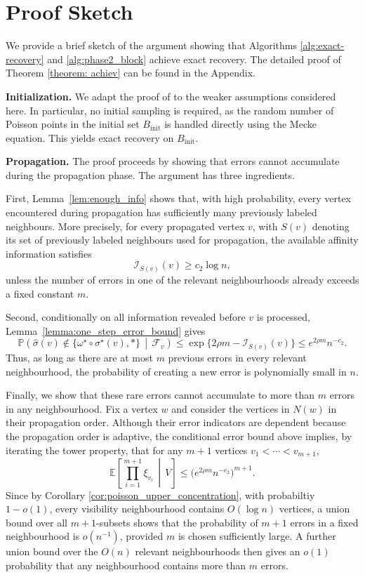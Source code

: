 \documentclass[11pt, a4paper]{amsart}
\newcommand{\1}{\mathbf{1}}
\theoremstyle{definition}
\theoremstyle{remark}
\theoremstyle{definition}
\begin{document}
\section{Proof Sketch}
We provide a brief sketch of the argument showing that Algorithms \ref{alg:exact-recovery} and \ref{alg:phase2_block} achieve exact recovery. The detailed proof of Theorem \ref{theorem: achiev} can be found in the Appendix. 

\textbf{Initialization.} We adapt the proof of \cite{gaudio2026jan} to the weaker assumptions considered here. In particular, no initial sampling is required, as the random number of Poisson points in the initial set $B_{\mathrm{init}}$ is handled directly using the Mecke equation. This yields exact recovery on $B_{\mathrm{init}}$.

\textbf{Propagation.}
The proof proceeds by showing that errors cannot accumulate during the
propagation phase. The argument has three ingredients.

First, Lemma~\ref{lem:enough_info} shows that, with high probability,
every vertex encountered during propagation has sufficiently many
previously labeled neighbours. More precisely, for every propagated vertex $v$, with $S(v)$ denoting its set of previously labeled neighbours used for propagation, the available affinity information satisfies
\[
\mathcal I_{S(v)}(v)\ge c_2\log n,
\]
unless the number of errors in one of the relevant neighbourhoods already
exceeds a fixed constant \(m\).

Second, conditionally on all information revealed before \(v\) is
processed, Lemma~\ref{lemma:one_step_error_bound} gives
\[
\mathbb P\left(
\widehat\sigma(v)\notin
\{\omega^\star\circ\sigma^\star(v),*\}
\,\middle|\,\mathcal F_v
\right)
\le
\exp\{2\rho m-\mathcal I_{S(v)}(v)\}
\le e^{2\rho m}n^{-c_2}.
\]
Thus, as long as there are at most \(m\) previous errors in every relevant
neighbourhood, the probability of creating a new error is polynomially
small in \(n\).

Finally, we show that these rare errors cannot accumulate to more than
\(m\) errors in any neighbourhood. Fix a vertex \(w\) and consider the
vertices in \(N(w)\) in their propagation order. Although their error
indicators are dependent because the propagation order is adaptive, the
conditional error bound above implies, by iterating the tower property,
that for any \(m+1\) vertices \(v_1<\cdots<v_{m+1}\),
\[
\mathbb E\left[
\prod_{i=1}^{m+1}\xi_{v_i}\,\middle|\,V
\right]
\le
\bigl(e^{2\rho m}n^{-c_2}\bigr)^{m+1}.
\]
Since by Corollary \ref{cor:poisson_upper_concentration}, with probabiltiy $1-o(1)$, every visibility neighbourhood contains  \(O(\log n)\) vertices, a union bound over all \(m+1\)-subsets shows that the
probability of \(m+1\) errors in a fixed neighbourhood is
\(o(n^{-1})\), provided \(m\) is chosen sufficiently large. A further
union bound over the \(O(n)\) relevant neighbourhoods then gives an
\(o(1)\) probability that any neighbourhood contains more than \(m\)
errors.
\end{document}
